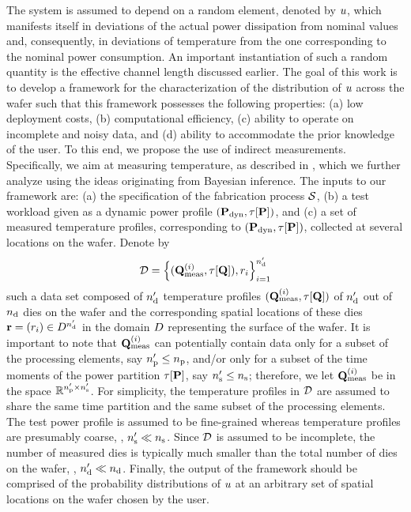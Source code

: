 The system is assumed to depend on a random element, denoted by $u$, which manifests itself in deviations of the actual power dissipation from nominal values and, consequently, in deviations of temperature from the one corresponding to the nominal power consumption.
An important instantiation of such a random quantity is the effective channel length discussed earlier.
The goal of this work is to develop a framework for the characterization of the distribution of $u$ across the wafer such that this framework possesses the following properties: (a) low deployment costs, (b) computational efficiency, (c) ability to operate on incomplete and noisy data, and (d) ability to accommodate the prior knowledge of the user.
To this end, we propose the use of indirect measurements. Specifically, we aim at measuring temperature, as described in , which we further analyze using the ideas originating from Bayesian inference.
The inputs to our framework are: (a) the specification of the fabrication process $\mathcal{S}$, (b) a test workload given as a dynamic power profile $(\mathbf{P}_{\text{dyn}}, \tau[\mathbf{P}])$, and (c) a set of measured temperature profiles, corresponding to $(\mathbf{P}_{\text{dyn}}, \tau[\mathbf{P}])$, collected at several locations on the wafer. Denote by
\[
  \mathcal{D} = \left\{ (\mathbf{Q}^{(i)}_{\text{meas}}, \tau[\mathbf{Q}]), r_i \right\}_{i = 1}^{n_\text{d}'}
\]
such a data set composed of ${n_\text{d}'}$ temperature profiles $(\mathbf{Q}^{(i)}_{\text{meas}}, \tau[\mathbf{Q}])$ of ${n_\text{d}'}$ out of ${n_\text{d}}$ dies on the wafer and the corresponding spatial locations of these dies $\mathbf{r} = (r_i) \in D^{n_\text{d}'}$ in the domain $D$ representing the surface of the wafer.
It is important to note that $\mathbf{Q}^{(i)}_{\text{meas}}$ can potentially contain data only for a subset of the processing elements, say ${n_\text{p}'} \leq {n_\text{p}}$, and/or only for a subset of the time moments of the power partition $\tau[\mathbf{P}]$, say ${n_\text{s}'} \leq {n_\text{s}}$; therefore, we let $\mathbf{Q}^{(i)}_{\text{meas}}$ be in the space $\mathbb{R}^{{n_\text{p}'} \times {n_\text{s}'}}$.
For simplicity, the temperature profiles in $\mathcal{D}$ are assumed to share the same time partition and the same subset of the processing elements.
The test power profile is assumed to be fine-grained whereas temperature profiles are presumably coarse, \ie, ${n_\text{s}'} \ll {n_\text{s}}$.
Since $\mathcal{D}$ is assumed to be incomplete, the number of measured dies is typically much smaller than the total number of dies on the wafer, \ie, ${n_\text{d}'} \ll {n_\text{d}}$.
Finally, the output of the framework should be comprised of the probability distributions of $u$ at an arbitrary set of spatial locations on the wafer chosen by the user.
